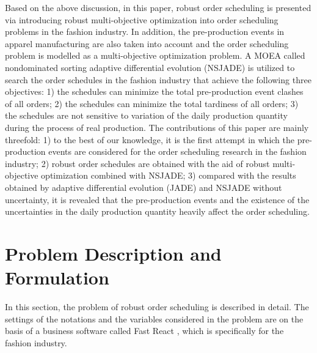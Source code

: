 \documentclass[journal]{IEEEtran}
\theoremstyle{definition}
\begin{document}
Based on the above discussion, in this paper, robust order scheduling is presented via introducing robust multi-objective optimization into order scheduling problems in the fashion industry. In addition, the pre-production events in apparel manufacturing are also taken into account and the order scheduling problem is modelled as a multi-objective optimization problem. A MOEA called nondominated sorting adaptive differential evolution (NSJADE) is utilized to search the order schedules in the fashion industry that achieve the following three objectives: 1) the schedules can minimize the total pre-production event clashes of all orders; 2) the schedules can minimize the total tardiness of all orders; 3) the schedules are not sensitive to variation of the daily production quantity during the process of real production. The contributions of this paper are mainly threefold: 1) to the best of our knowledge, it is the first attempt in which the pre-production events are considered for the order scheduling research in the fashion industry; 2) robust order schedules are obtained with the aid of robust multi-objective optimization combined with NSJADE; 3) compared with the results obtained by adaptive differential evolution (JADE) and NSJADE without uncertainty, it is revealed that the pre-production events and the existence of the uncertainties in the daily production quantity heavily affect the order scheduling.

\section{Problem Description and Formulation}\label{sec1}
In this section, the problem of robust order scheduling is described in detail. The settings of the notations and the variables considered in the problem are on the basis of a business software called Fast React \cite{fastreact}, which is specifically for the fashion industry.
\end{document}
